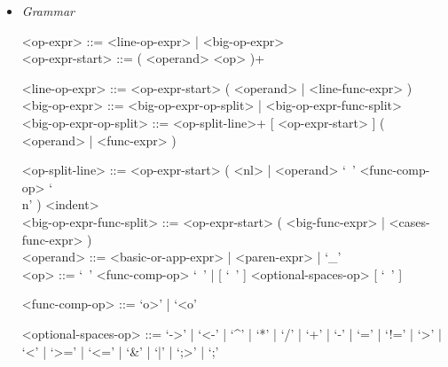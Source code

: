 \documentclass{article}
\begin{document}
\begin{itemize}
\begin{verbatim}
"Hello, I'm a big string that's going to contain multiple values from " +
"inside the imaginary program that I'm a part of. Here they are:\n" +
"value1 = " + value1 + ", value2 = " + value2 + ", value3 = " + value3 + 
", value4 = " + value4 + ", value5 = " + value5
\end{verbatim}

\textbf{Description}

It is possible to stretch a (big) operator expression over multiple lines.
In that case:
\begin{itemize}
\item
The operator expression must split in a new line after an operator (not an
argument).

\item
Every line after the first must be indented so that in begins at the column 
where the first line of the operator expression begun.

\item
The precise indentation rules are described in the section
"Indentation System" \ref{subsubsec:indsys}.
\end{itemize}

\item \textit{Grammar}
\begin{grammar}
<op-expr> ::= <line-op-expr> | <big-op-expr>
\\

<op-expr-start> ::= ( <operand> <op> )+

<line-op-expr> ::= <op-expr-start> ( <operand> | <line-func-expr> )
\\

<big-op-expr> ::= 
<big-op-expr-op-split> | <big-op-expr-func-split>
\\

<big-op-expr-op-split> ::= 
<op-split-line>+ [ <op-expr-start> ] ( <operand> | <func-expr> )

<op-split-line> ::=
<op-expr-start> ( <nl> | <operand> `\ ' <func-comp-op> `\\n' ) <indent> 
\\

<big-op-expr-func-split> ::=
<op-expr-start> ( <big-func-expr> | <cases-func-expr> )
\\

<operand> ::= <basic-or-app-expr> | <paren-expr> | `_'
\\

<op> ::= `\ ' <func-comp-op> `\ ' | [ `\ ' ] <optional-spaces-op> [ `\ ' ]

<func-comp-op> ::= `o>' | `<o'

<optional-spaces-op> ::= 
`->' | `<-' | `^' | `*' | `/' | `+' | `-' | `=' | `!=' | `>' | `<' | `>=' |
`<=' | `\&' | `|' | `;>' | `;'
\end{grammar}
\end{itemize}
\end{document}
